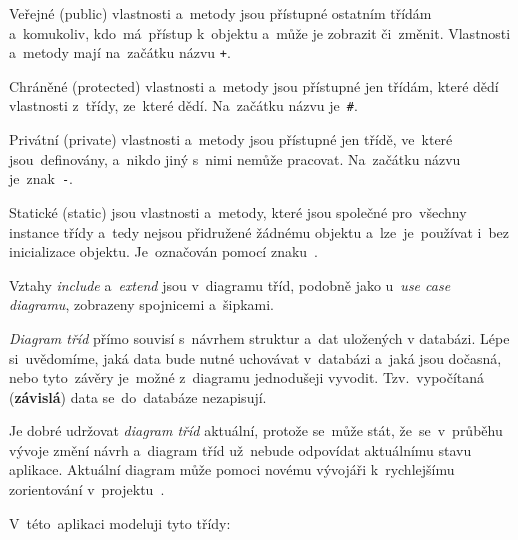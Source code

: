 \documentclass[11pt,a4paper]{report}
\begin{document}
                \begin{description}
                    \item{Veřejné (public)} vlastnosti a~metody jsou přístupné ostatním třídám a~komukoliv, kdo~má~přístup k~objektu a~může je zobrazit či~změnit. Vlastnosti a~metody mají na~začátku názvu \texttt{+}.

                    \item{Chráněné (protected)} vlastnosti a~metody jsou přístupné jen třídám, které dědí vlastnosti z~třídy, ze~které dědí. Na~začátku názvu je~\texttt{\#}.
                
                    \item{Privátní (private)} vlastnosti a~metody jsou přístupné jen třídě, ve~které jsou~definovány, a~nikdo jiný s~nimi nemůže pracovat. Na~začátku názvu je~znak~\texttt{-}.
                
                    \item{Statické (static)} jsou vlastnosti a~metody, které jsou společné pro~všechny instance třídy a~tedy nejsou přidružené žádnému objektu a~lze~je~používat i~bez inicializace objektu. Je~označován pomocí znaku~\texttt{\textunderscore}.
                \end{description}
                
                Vztahy \emph{include} a~\emph{extend} jsou v~diagramu tříd, podobně jako u~\emph{use case diagramu}, zobrazeny spojnicemi a~šipkami.

                \emph{Diagram tříd} přímo souvisí s~návrhem struktur a~dat uložených v databázi. Lépe si~uvědomíme, jaká data bude nutné uchovávat v~databázi a~jaká jsou dočasná, nebo tyto~závěry je~možné z~diagramu jednodušeji vyvodit. Tzv.~vypočítaná (\textbf{závislá}) data se~do~databáze nezapisují.

                Je dobré udržovat \emph{diagram tříd} aktuální, protože se~může stát, že~se~v~průběhu vývoje změní návrh a~diagram tříd už~nebude odpovídat aktuálnímu stavu aplikace. Aktuální diagram může pomoci novému vývojáři k~rychlejšímu zorientování v~projektu~\cite{visualparadigmClassDiagram}.

                
                V~této~aplikaci modeluji tyto třídy:
\end{document}
